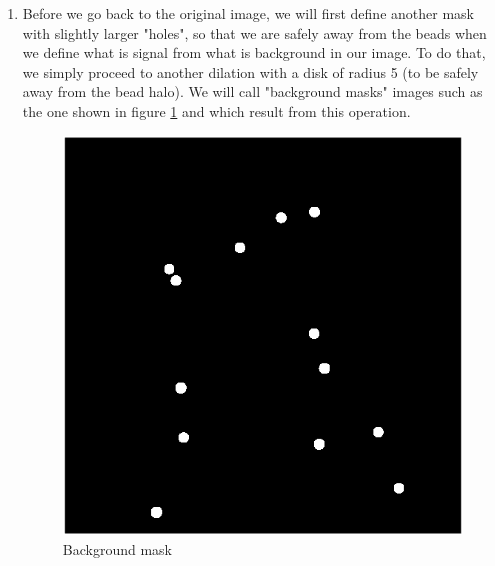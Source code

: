\documentclass[a4paper]{article}
\begin{document}
\begin{enumerate}
    \item Before we go back to the original image, we will first define another mask with slightly larger "holes", so that we are safely away from the beads when we define what is signal from what is background in our image. To do that, we simply proceed to another dilation with a disk of radius 5 (to be safely away from the bead halo). We will call "background masks" images such as the one shown in figure \ref{fig7} and which result from this operation.
    \begin{figure}[H]
        \center
        \label{fig7}
        \includegraphics[scale=0.75]{cleanMaskbkg.png}
        \caption{Background mask}
    \end{figure}


\end{enumerate}
\end{document}
